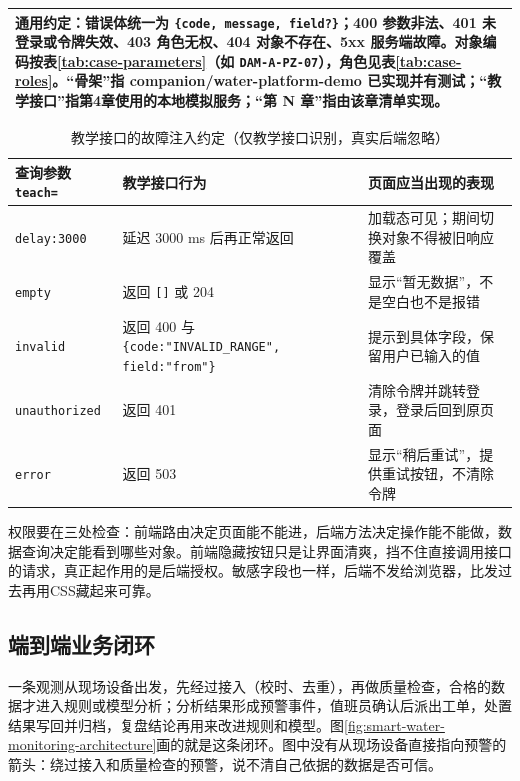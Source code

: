 \begin{table}[htbp]
\begin{tabular}{p{3.1cm}p{2.5cm}p{3.5cm}p{2.8cm}p{1.7cm}}
\midrule
\multicolumn{5}{p{13.9cm}}{\textbf{通用约定}：错误体统一为 \texttt{\{code, message, field?\}}；400 参数非法、401 未登录或令牌失效、403 角色无权、404 对象不存在、5xx 服务端故障。对象编码按表\ref{tab:case-parameters}（如 \texttt{DAM-A-PZ-07}），角色见表\ref{tab:case-roles}。“骨架”指 companion/water-platform-demo 已实现并有测试；“教学接口”指第4章使用的本地模拟服务；“第 N 章”指由该章清单实现。} \\
\bottomrule
\end{tabular}
\end{table}

\begin{table}[htbp]
\centering
\caption{教学接口的故障注入约定（仅教学接口识别，真实后端忽略）}
\label{tab:api-teach-faults}
\small
\begin{tabular}{p{3.2cm}p{5.2cm}p{5.0cm}}
\toprule
查询参数 \texttt{teach=} & 教学接口行为 & 页面应当出现的表现 \\
\midrule
\texttt{delay:3000} & 延迟 3000 ms 后再正常返回 & 加载态可见；期间切换对象不得被旧响应覆盖 \\
\texttt{empty} & 返回 \texttt{[]} 或 204 & 显示“暂无数据”，不是空白也不是报错 \\
\texttt{invalid} & 返回 400 与 \texttt{\{code:"INVALID\_RANGE", field:"from"\}} & 提示到具体字段，保留用户已输入的值 \\
\texttt{unauthorized} & 返回 401 & 清除令牌并跳转登录，登录后回到原页面 \\
\texttt{error} & 返回 503 & 显示“稍后重试”，提供重试按钮，不清除令牌 \\
\bottomrule
\end{tabular}
\end{table}

权限要在三处检查：前端路由决定页面能不能进，后端方法决定操作能不能做，数据查询决定能看到哪些对象。前端隐藏按钮只是让界面清爽，挡不住直接调用接口的请求，真正起作用的是后端授权。敏感字段也一样，后端不发给浏览器，比发过去再用CSS藏起来可靠。

\subsection{端到端业务闭环}

一条观测从现场设备出发，先经过接入（校时、去重），再做质量检查，合格的数据才进入规则或模型分析；分析结果形成预警事件，值班员确认后派出工单，处置结果写回并归档，复盘结论再用来改进规则和模型。图\ref{fig:smart-water-monitoring-architecture}画的就是这条闭环。图中没有从现场设备直接指向预警的箭头：绕过接入和质量检查的预警，说不清自己依据的数据是否可信。

